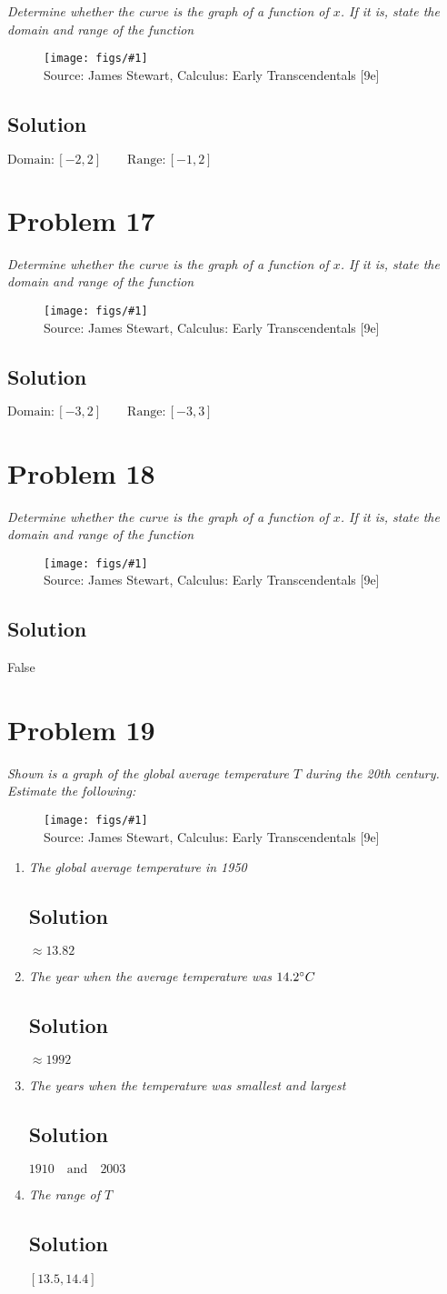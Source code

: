 \documentclass[11pt]{article}
\newcommand{\soln}{\subsection*}
\newcommand{\qn}{\textit}
\newcommand{\imagesource}[1]{{\footnotesize Source: #1}}
\newcommand{\img}[1]{
	\begin{figure}[h]
		\centering
		\texttt{[image: figs/\#1]}\\
		\imagesource{James Stewart, Calculus: Early Transcendentals [9e]}
	\end{figure}
}
\begin{document}
\qn{Determine whether the curve is the graph of a function of $x$. If it is, state the domain and range of the function}

\img{1.1.16}

\soln{Solution}
$\mathrm{Domain}:[-2,2] \qquad\mathrm{Range}:[-1,2]$

\section*{Problem 17}

\qn{Determine whether the curve is the graph of a function of $x$. If it is, state the domain and range of the function}

\img{1.1.17}

\soln{Solution}
$\mathrm{Domain}:[-3,2] \qquad\mathrm{Range}:[-3,3]$

\section*{Problem 18}

\qn{Determine whether the curve is the graph of a function of $x$. If it is, state the domain and range of the function}

\img{1.1.18}

\soln{Solution}
False

\section*{Problem 19}

\qn{Shown is a graph of the global average temperature $T$ during the 20th century. Estimate the following:}

\img{1.1.19}

\begin{enumerate}
	\item \qn{The global average temperature in 1950}
	\soln{Solution}
	$\approx 13.82$
	
	\item \qn{The year when the average temperature was $14.2 \degree C$}
	\soln{Solution}
	$\approx 1992$
	
	\item \qn{The years when the temperature was smallest and largest}
	\soln{Solution}
	$1910 \quad \text{and} \quad 2003$
	
	\item \qn{The range of $T$}
	\soln{Solution}
	$[13.5, 14.4]$
\end{enumerate}
\end{document}
